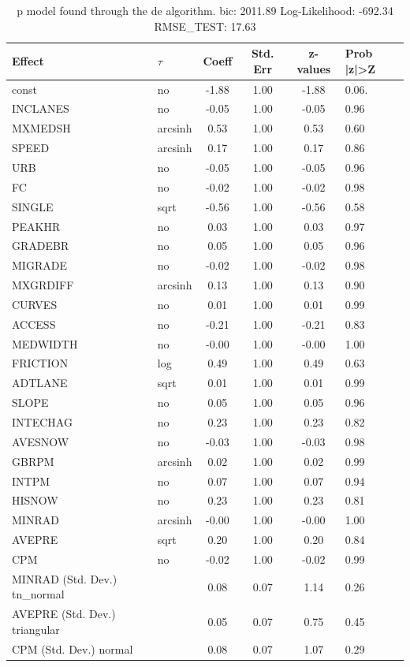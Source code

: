 \begin{table}
	\caption{p model found through the de algorithm. bic: 2011.89 Log-Likelihood: -692.34 RMSE_TEST: 17.63}
	\begin{center}
		\begin{tabular}{|l|l|c|c|c|l|}
			\hline
			Effect & $\tau$ & Coeff & Std. Err & z-values & Prob |z|>Z \\
			\hline
			const & no & -1.88 & 1.00 & -1.88 & 0.06. \\
			\hline
			INCLANES & no & -0.05 & 1.00 & -0.05 & 0.96 \\
			\hline
			MXMEDSH & arcsinh & 0.53 & 1.00 & 0.53 & 0.60 \\
			\hline
			SPEED & arcsinh & 0.17 & 1.00 & 0.17 & 0.86 \\
			\hline
			URB & no & -0.05 & 1.00 & -0.05 & 0.96 \\
			\hline
			FC & no & -0.02 & 1.00 & -0.02 & 0.98 \\
			\hline
			SINGLE & sqrt & -0.56 & 1.00 & -0.56 & 0.58 \\
			\hline
			PEAKHR & no & 0.03 & 1.00 & 0.03 & 0.97 \\
			\hline
			GRADEBR & no & 0.05 & 1.00 & 0.05 & 0.96 \\
			\hline
			MIGRADE & no & -0.02 & 1.00 & -0.02 & 0.98 \\
			\hline
			MXGRDIFF & arcsinh & 0.13 & 1.00 & 0.13 & 0.90 \\
			\hline
			CURVES & no & 0.01 & 1.00 & 0.01 & 0.99 \\
			\hline
			ACCESS & no & -0.21 & 1.00 & -0.21 & 0.83 \\
			\hline
			MEDWIDTH & no & -0.00 & 1.00 & -0.00 & 1.00 \\
			\hline
			FRICTION & log & 0.49 & 1.00 & 0.49 & 0.63 \\
			\hline
			ADTLANE & sqrt & 0.01 & 1.00 & 0.01 & 0.99 \\
			\hline
			SLOPE & no & 0.05 & 1.00 & 0.05 & 0.96 \\
			\hline
			INTECHAG & no & 0.23 & 1.00 & 0.23 & 0.82 \\
			\hline
			AVESNOW & no & -0.03 & 1.00 & -0.03 & 0.98 \\
			\hline
			GBRPM & arcsinh & 0.02 & 1.00 & 0.02 & 0.99 \\
			\hline
			INTPM & no & 0.07 & 1.00 & 0.07 & 0.94 \\
			\hline
			HISNOW & no & 0.23 & 1.00 & 0.23 & 0.81 \\
			\hline
			MINRAD & arcsinh & -0.00 & 1.00 & -0.00 & 1.00 \\
			\hline
			AVEPRE & sqrt & 0.20 & 1.00 & 0.20 & 0.84 \\
			\hline
			CPM & no & -0.02 & 1.00 & -0.02 & 0.99 \\
			\hline
			MINRAD (Std. Dev.) tn_normal &  & 0.08 & 0.07 & 1.14 & 0.26 \\
			\hline
			AVEPRE (Std. Dev.) triangular &  & 0.05 & 0.07 & 0.75 & 0.45 \\
			\hline
			CPM (Std. Dev.) normal &  & 0.08 & 0.07 & 1.07 & 0.29 \\
			\hline
		\end{tabular}
	\end{center}
\end{table}